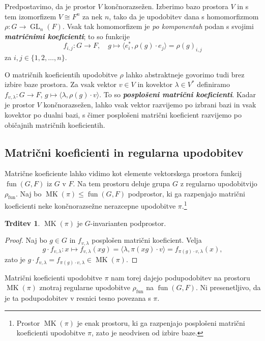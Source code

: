 \documentclass[11pt]{book}
\DeclareMathOperator\MK{MK}
\DeclareMathOperator\fun{fun}
\DeclareMathOperator\GL{GL}
\def\definicija{\color{rdeca}\bf\em}
\theoremstyle{definition}
\theoremstyle{zgled}
\theoremstyle{odprtproblem}
\theoremstyle{domacanaloga}
\newenvironment{dokaz}
    {\color{siva}\begin{proof}}
    {\end{proof}}
\theoremstyle{izrek}
\newtheorem*{trditev}{Trditev}
\begin{document}
Predpostavimo, da je prostor $V$ končnorazsežen. Izberimo bazo prostora $V$ in s tem izomorfizem $V \cong F^n$ za nek $n$, tako da je upodobitev dana s homomorfizmom $\rho \colon G \to \GL_n(F)$. Vsak tak homomorfizem je \emph{po komponentah} podan s svojimi {\definicija matričnimi koeficienti}; to so funkcije
\[
    f_{i,j} \colon G \to F, \quad
    g \mapsto \langle e_i^*, \rho(g) \cdot e_j \rangle = \rho(g)_{i,j}
\]
za $i,j \in \{ 1, 2, \dots, n \}$. 

O matričnih koeficientih upodobitve $\rho$ lahko abstraktneje govorimo tudi brez izbire baze prostora. Za vsak vektor $v \in V$ in kovektor $\lambda \in V^*$ definiramo $f_{v, \lambda} \colon G \to F$, $g \mapsto \langle \lambda, \rho(g) \cdot v \rangle$. To so {\definicija posplošeni matrični koeficienti}. Kadar je prostor $V$ končnorazsežen, lahko vsak vektor razvijemo po izbrani bazi in vsak kovektor po dualni bazi, s čimer posplošeni matrični koeficient razvijemo po običajnih matričnih koeficientih.

\subsection{Matrični koeficienti in regularna upodobitev}

Matrične koeficiente lahko vidimo kot elemente vektorskega prostora funkcij $\fun(G,F)$ iz $G$ v $F$. Na tem prostoru deluje grupa $G$ z regularno upodobitvijo $\rho_{\fun}$. Naj bo $\MK(\pi) \leq \fun(G,F)$ podprostor, ki ga razpenjajo matrični koeficienti neke končnorazsežne nerazcepne upodobitve $\pi$.\footnote{Prostor $\MK(\pi)$ je enak prostoru, ki ga razpenjajo posplošeni matrični koeficienti upodobitve $\pi$, zato je neodvisen od izbire baze.}

\begin{trditev}
$\MK(\pi)$ je $G$-invarianten podprostor.
\end{trditev}
\begin{dokaz}
Naj bo $g \in G$ in $f_{v, \lambda}$ posplošen matrični koeficient. Velja
\[
    g \cdot f_{v, \lambda} \colon x \mapsto f_{v, \lambda}(xg) =
    \langle \lambda, \pi(xg) \cdot v \rangle =
    f_{\pi(g) \cdot v, \lambda}(x),
\]
zato je $g \cdot f_{v, \lambda} = f_{\pi(g) \cdot v, \lambda} \in \MK(\pi)$.
\end{dokaz}

Matrični koeficienti upodobitve $\pi$ nam torej dajejo podupodobitev na prostoru $\MK(\pi)$ znotraj regularne upodobitve $\rho_{\fun}$ na $\fun(G,F)$. Ni presenetljivo, da je ta podupodobitev v resnici tesno povezana s $\pi$.
\end{document}
